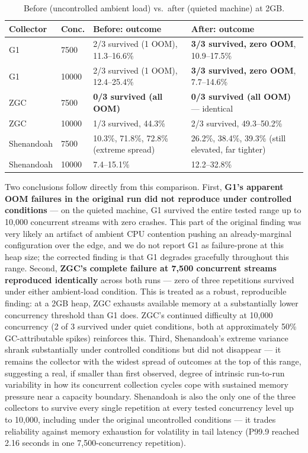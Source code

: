 \documentclass[11pt]{article}
\begin{document}
\begin{table}[h]
\centering
\caption{Before (uncontrolled ambient load) vs.\ after (quieted machine) at 2GB.}
\label{tab:beforeafter}
\small
\begin{tabular}{p{1.6cm}p{1.3cm}p{4.8cm}p{4.8cm}}
\toprule
Collector & Conc. & Before: outcome & After: outcome \\
\midrule
G1 & 7500 & 2/3 survived (1 OOM), 11.3--16.6\% & \textbf{3/3 survived, zero OOM}, 10.9--17.5\% \\
G1 & 10000 & 2/3 survived (1 OOM), 12.4--25.4\% & \textbf{3/3 survived, zero OOM}, 7.7--14.6\% \\
ZGC & 7500 & \textbf{0/3 survived (all OOM)} & \textbf{0/3 survived (all OOM)} --- identical \\
ZGC & 10000 & 1/3 survived, 44.3\% & 2/3 survived, 49.3--50.2\% \\
Shenandoah & 7500 & 10.3\%, 71.8\%, 72.8\% (extreme spread) & 26.2\%, 38.4\%, 39.3\% (still elevated, far tighter) \\
Shenandoah & 10000 & 7.4--15.1\% & 12.2--32.8\% \\
\bottomrule
\end{tabular}
\end{table}

Two conclusions follow directly from this comparison. First, \textbf{G1's apparent OOM failures
in the original run did not reproduce under controlled conditions} --- on the quieted machine, G1
survived the entire tested range up to 10{,}000 concurrent streams with zero crashes. This part
of the original finding was very likely an artifact of ambient CPU contention pushing an
already-marginal configuration over the edge, and we do not report G1 as failure-prone at this
heap size; the corrected finding is that G1 degrades gracefully throughout this range. Second,
\textbf{ZGC's complete failure at 7{,}500 concurrent streams reproduced identically} across both
runs --- zero of three repetitions survived under either ambient-load condition. This is treated
as a robust, reproducible finding: at a 2GB heap, ZGC exhausts available memory at a substantially
lower concurrency threshold than G1 does. ZGC's continued difficulty at 10{,}000 concurrency
(2 of 3 survived under quiet conditions, both at approximately 50\% GC-attributable spikes)
reinforces this. Third, Shenandoah's extreme variance shrank substantially under controlled
conditions but did not disappear --- it remains the collector with the widest spread of outcomes
at the top of this range, suggesting a real, if smaller than first observed, degree of intrinsic
run-to-run variability in how its concurrent collection cycles cope with sustained memory
pressure near a capacity boundary. Shenandoah is also the only one of the three collectors to
survive every single repetition at every tested concurrency level up to 10{,}000, including under
the original uncontrolled conditions --- it trades reliability against memory exhaustion for
volatility in tail latency (P99.9 reached 2.16 seconds in one 7{,}500-concurrency repetition).
\end{document}
